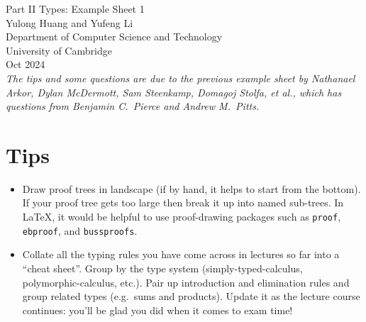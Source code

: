 \documentclass[11pt,a4paper,twoside]{article}
\begin{document}
\begin{center}
{\Huge Part II Types: Example Sheet 1}\\
\vspace{1.0em}
{\large Yulong Huang and Yufeng Li}\\
\vspace{0.5em}
{\small Department of Computer Science and Technology \\ University of Cambridge \\ Oct 2024}\\
\vspace{1.0em}
\small{\textit{The tips and some questions are due to the previous example sheet by Nathanael Arkor, Dylan McDermott, Sam  Steenkamp, Domagoj Stolfa, et al., which has questions from Benjamin C.~Pierce and Andrew M.~Pitts.}}
\end{center}

\section*{Tips}

\begin{itemize}

\item Draw proof trees in landscape (if by hand, it helps to start from the bottom). If your proof tree gets
too large then break it up into named sub-trees. In \LaTeX, it would be helpful to use proof-drawing packages such as 
\texttt{proof}, \texttt{ebproof}, and \texttt{bussproofs}. 

\item Collate all the typing rules you have come across in lectures so far into a ``cheat sheet''. Group by
the type system (simply-typed-calculus, polymorphic-calculus, etc.). Pair up introduction and
elimination rules and group related types (e.g.~sums and products). Update it as the lecture course
continues: you’ll be glad you did when it comes to exam time!



\end{itemize}
\end{document}
